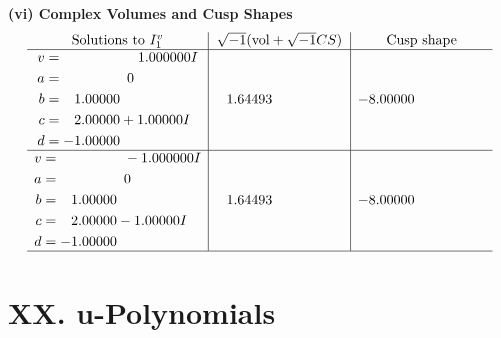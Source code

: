 \documentclass[1p]{elsarticle_modified}
\theoremstyle{definition}
\newcommand{\I}{\sqrt{-1}}
\begin{document}
\newpage\flushleft \textbf{(vi) Complex Volumes and Cusp Shapes}
$$\begin{array}{c|c|c}  
\text{Solutions to }I^v_{1}& \I (\text{vol} + \sqrt{-1}CS) & \text{Cusp shape}\\
 \hline 
\begin{aligned}
v &= \phantom{-0.000000 -}1.000000 I \\
a &= \phantom{-0.000000 } 0 \\
b &= \phantom{-}1.00000\phantom{ +0.000000I} \\
c &= \phantom{-}2.00000 + 1.00000 I \\
d &= -1.00000\phantom{ +0.000000I}\end{aligned}
 & \phantom{-}1.64493\phantom{ +0.000000I} & -8.00000\phantom{ +0.000000I} \\ \hline\begin{aligned}
v &= \phantom{-0.000000 } -1.000000 I \\
a &= \phantom{-0.000000 } 0 \\
b &= \phantom{-}1.00000\phantom{ +0.000000I} \\
c &= \phantom{-}2.00000 - 1.00000 I \\
d &= -1.00000\phantom{ +0.000000I}\end{aligned}
 & \phantom{-}1.64493\phantom{ +0.000000I} & -8.00000\phantom{ +0.000000I}\\
 \hline 
 \end{array}$$\newpage
\newpage\renewcommand{\arraystretch}{1}
\centering \section*{ XX. u-Polynomials}
\end{document}
